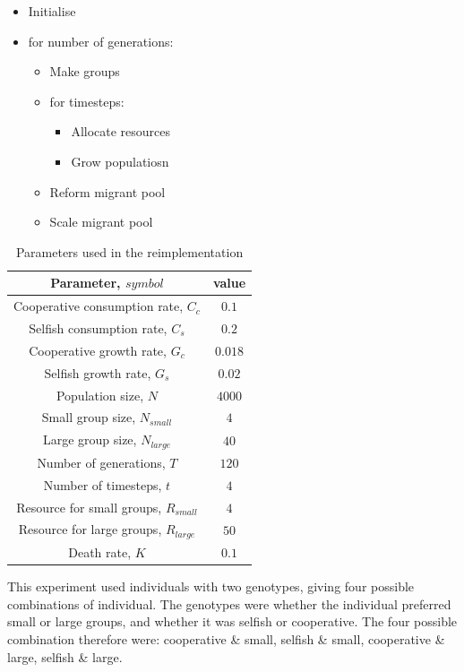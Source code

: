 \documentclass[11pt]{ecsarticle}
\begin{document}
\begin{itemize}
 \item Initialise
 \item for number of generations:
 \begin{itemize}
  \item Make groups
  \item for timesteps:
  \begin{itemize}
   \item Allocate resources
   \item Grow populatiosn
  \end{itemize}
  \item Reform migrant pool
  \item Scale migrant pool
 \end{itemize}
\end{itemize}

\begin{table}[b]
\centering
 \caption{Parameters used in the reimplementation}
 \label{table:params}
 \begin{tabular}{|c|c|}\hline
 Parameter, $symbol$ & value \\ \hline
  Cooperative consumption rate, $C_c$	&	$0.1$		\\ 
  Selfish consumption rate, $C_s$	&	$0.2$		\\ 
  Cooperative growth rate, $G_c$	&	$0.018$		\\ 
  Selfish growth rate, $G_s$		&	$0.02$		\\ 
  Population size, $N$			&	$4000$		\\ 
  Small group size, $N_{small}$	&	$4$		\\ 
  Large group size, $N_{large}$	&	$40$		\\ 
  Number of generations, $T$		&	$120$		\\ 
  Number of timesteps, $t$		&	$4$		\\ 
  Resource for small groups, $R_{small}$&	$4$		\\ 
  Resource for large groups, $R_{large}$&	$50$		\\ 
  Death rate, $K$			&	$0.1$		\\ \hline
 \end{tabular}
\end{table}

This experiment used individuals with two genotypes, giving four possible combinations of individual.
The genotypes were whether the individual preferred small or large groups, and whether it was selfish or cooperative.
The four possible combination therefore were: cooperative \& small, selfish \& small, cooperative \& large, selfish \& large. 
\end{document}
